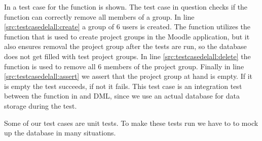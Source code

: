 \begin{comment}

\end{comment}
In  a test case for the function  is shown.
The test case in question checks if the function can correctly remove all members of a group. 
In line \ref{src:testcasedelall:create} a group of $6$ users is created.
The function  utilizes the function that is used to create project groups in the Moodle application, but it also ensures removal the project group after the tests are run, so the database does not get filled with test project groups.
In line \ref{src:testcasedelall:delete} the function  is used to remove all $6$ members of the project group.
Finally in line \ref{src:testcasedelall:assert} we assert that the project group at hand is empty.
If it is empty the test succeeds, if not it fails.
This test case is an integration test between the function  in \admlib{} and \moodle{} DML, since we use an actual database for data storage during the test.

Some of our test cases are unit tests.
To make these tests run we have to to mock up the database in many situations.

